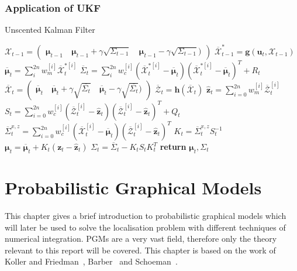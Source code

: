 \documentclass[12pt,oneside,openany,a4paper, %
afrikaans,english,
]{memoir}
\numberwithin{equation}{chapter}
\begin{document}
\subsection{Application of UKF}
\begin{algorithm}
\caption{Unscented Kalman Filter}\label{UKFalg}
\begin{algorithmic}[1]
\State $\mathcal{X}_{t-1} = 
\begin{pmatrix}
\bm{\mu}_{t-1}  & \ \bm{\mu}_{t-1}+\gamma\sqrt{\Sigma_{t-1}} & \ \bm{\mu}_{t-1} - \gamma \sqrt{\Sigma_{t-1}})
\end{pmatrix}
$ 
\State $\overline{\mathcal{X}}^*_{t-1} = \bm{g}(\bm{u}_t, \mathcal{X}_{t-1})$
\State $\bm{\overline{\mu}}_t = \sum_i^{2n} w_m^{[i]} \overline{\mathcal{X}}^{*[i]}_{t}$
\State $\overline{\Sigma}_t = \sum_i^{2n}w_c^{[i]}\left(\mathcal{\overline{X}}_t^{*[i]} - \overline{\bm{\mu}}_t\right)\left(\mathcal{\overline{X}}_t^{*[i]} - \overline{\bm{\mu}}_t\right)^T +R_t$
\State $\mathcal{\overline{X}}_t = 
\begin{pmatrix}
\bm{\overline{\mu}}_{t}  & \ \bm{\overline{\mu}}_{t}+\gamma\sqrt{\overline{\Sigma_{t}}} & \ \bm{\overline{\mu}}_{t} - \gamma \sqrt{\overline{\Sigma_{t}}})
\end{pmatrix}$
\State $\overline{\mathcal{Z}}_t = \bm{h}\left(\mathcal{\overline{X}}_t\right)$
\State $\hat{\bm{z}}_t = \sum_{i=0}^{2n}w_m^{[i]} \overline{\mathcal{Z}}_t^{[i]}$ 
\State $S_t = \sum_{i=0}^{2n} w_c^{[i]}\left( \overline{\mathcal{Z}}_t^{[i]} - \hat{\bm{z}}_t  \right)\left( \overline{\mathcal{Z}}_t^{[i]} - \hat{\bm{z}}_t  \right)^T + Q_t$
\State $\overline{\Sigma}_t^{x,z} = \sum_{i=0}^{2n}  w_c^{[i]}\left( \overline{\mathcal{X}}_t^{[i]} - \overline{\bm{\mu}}_t  \right)\left( \overline{\mathcal{Z}}_t^{[i]} - \hat{\bm{z}}_t  \right)^T $
\State $K_t = \overline{\Sigma}_t^{x,z}S_t^{-1}$
\State $\bm{\mu}_t = \overline{\bm{\mu}}_t + K_t(\bm{z}_t - \hat{\bm{z}}_t)$
\State $\Sigma_t = \overline{\Sigma}_t - K_tS_tK_t^T$
\State \textbf{return} $\bm{\mu}_t, \Sigma_t$
\EndProcedure
\end{algorithmic}
\end{algorithm}

\chapter{Probabilistic Graphical Models}
This chapter gives a brief introduction to probabilistic graphical models which will later be used to solve the localisation problem with different techniques of numerical integration. PGMs are a very vast field, therefore only the theory relevant to this report will be covered. This chapter is based on the work of Koller and Friedman~\cite{koller}, Barber~\cite{barber} and Schoeman~\citep{JC}.
\end{document}
